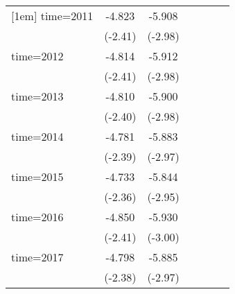 \begin{table}[htbp]
\begin{tabular}{l*{6}{c}}
[1em]
time=2011           &      -4.823\sym{**} &      -5.908\sym{***}&                     &                     &                     &                     \\
                    &     (-2.41)         &     (-2.98)         &                     &                     &                     &                     \\
[1em]
time=2012           &      -4.814\sym{**} &      -5.912\sym{***}&                     &                     &                     &                     \\
                    &     (-2.41)         &     (-2.98)         &                     &                     &                     &                     \\
[1em]
time=2013           &      -4.810\sym{**} &      -5.900\sym{***}&                     &                     &                     &                     \\
                    &     (-2.40)         &     (-2.98)         &                     &                     &                     &                     \\
[1em]
time=2014           &      -4.781\sym{**} &      -5.883\sym{***}&                     &                     &                     &                     \\
                    &     (-2.39)         &     (-2.97)         &                     &                     &                     &                     \\
[1em]
time=2015           &      -4.733\sym{**} &      -5.844\sym{***}&                     &                     &                     &                     \\
                    &     (-2.36)         &     (-2.95)         &                     &                     &                     &                     \\
[1em]
time=2016           &      -4.850\sym{**} &      -5.930\sym{***}&                     &                     &                     &                     \\
                    &     (-2.41)         &     (-3.00)         &                     &                     &                     &                     \\
[1em]
time=2017           &      -4.798\sym{**} &      -5.885\sym{***}&                     &                     &                     &                     \\
                    &     (-2.38)         &     (-2.97)         &                     &                     &                     &                     \\

\end{tabular}
\end{table}
